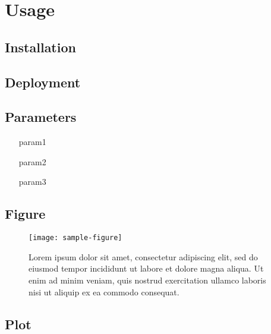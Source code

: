 \chapter{Usage}
\label{app:usage}


\lipsum[1]


\section{Installation}
\label{sec:installation}

\lipsum[1]


\section{Deployment}
\label{sec:deployment}

\lipsum[1]


\section{Parameters}
\label{sec:parameters}

\lipsum[1]

\begin{itemize}
	\item[param1] \lipsum[1]
	
	\item[param2] \lipsum[1]
	
	\item[param3] \lipsum[1]
\end{itemize}

\lipsum[1]


\section*{Figure}

\begin{figure}	
	\label{fig:sample-figure}
	\centering
	\texttt{[image: sample-figure]}
	\caption{Lorem ipsum dolor sit amet, consectetur adipiscing elit, sed do eiusmod tempor incididunt ut labore et dolore magna aliqua. Ut enim ad minim veniam, quis nostrud exercitation ullamco laboris nisi ut aliquip ex ea commodo consequat.}
\end{figure}

\section*{Plot}

